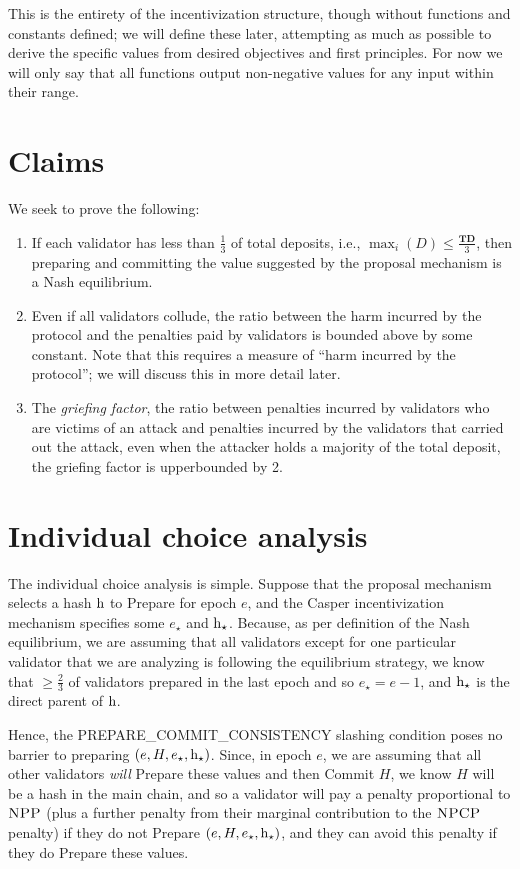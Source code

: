 \documentclass[12pt, final]{article}
\newcommand{\epoch}{\ensuremath{e}}
\newcommand{\hash}{\textnormal{h}}
\newcommand{\hashsource}{\hash_{\star}\xspace}
\newcommand{\epochsource}{\epoch_{\star}\xspace}
\newcommand{\NPP}{\textsc{NPP}\xspace}
\newcommand{\NPCP}{\textsc{NPCP}\xspace}
\newcommand{\totaldeposit}{ \textbf{TD} \xspace}
\begin{document}
This is the entirety of the incentivization structure, though without functions and constants defined; we will define these later, attempting as much as possible to derive the specific values from desired objectives and first principles. For now we will only say that all functions output non-negative values for any input within their range.

\section{Claims}

We seek to prove the following:

\begin{enumerate}
\item If each validator has less than $\frac{1}{3}$ of total deposits, i.e., $\max_i(D) \leq \frac{\totaldeposit}{3}$, then preparing and committing the value suggested by the proposal mechanism is a Nash equilibrium.
\item Even if all validators collude, the ratio between the harm incurred by the protocol and the penalties paid by validators is bounded above by some constant. Note that this requires a measure of ``harm incurred by the protocol''; we will discuss this in more detail later.
\item The \emph{griefing factor}, the ratio between penalties incurred by validators who are victims of an attack and penalties incurred by the validators that carried out the attack, even when the attacker holds a majority of the total deposit, the griefing factor is upperbounded by 2.
\end{enumerate}

\section{Individual choice analysis}

The individual choice analysis is simple. Suppose that the proposal mechanism selects a hash $\hash$ to Prepare for epoch $e$, and the Casper incentivization mechanism specifies some $\epochsource$ and $\hashsource$. Because, as per definition of the Nash equilibrium, we are assuming that all validators except for one particular validator that we are analyzing is following the equilibrium strategy, we know that $\ge \frac{2}{3}$ of validators prepared in the last epoch and so $\epochsource = \epoch - 1$, and $\hashsource$ is the direct parent of $\hash$.

Hence, the PREPARE\_COMMIT\_CONSISTENCY slashing condition poses no barrier to preparing $(e, H, \epochsource, \hashsource)$. Since, in epoch $e$, we are assuming that all other validators \emph{will} Prepare these values and then Commit $H$, we know $H$ will be a hash in the main chain, and so a validator will pay a penalty proportional to $\NPP$ (plus a further penalty from their marginal contribution to the $\NPCP$ penalty) if they do not Prepare $(e, H, \epochsource, \hashsource)$, and they can avoid this penalty if they do Prepare these values.
\end{document}
